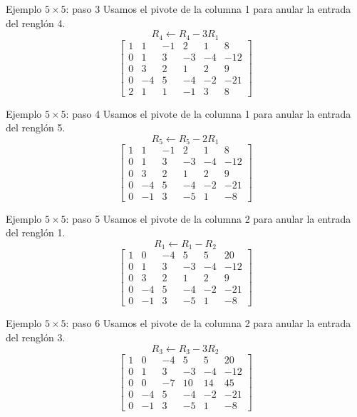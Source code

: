 \documentclass[aspectratio=169,9pt]{beamer}
\theoremstyle{remark}
\begin{document}
\begin{frame}[t]{Ejemplo $5\times5$: paso 3}
Usamos el pivote de la columna 1 para anular la entrada del renglón 4.
\[
R_{4}\leftarrow R_{4}-3R_{1}
\]
\[
\left[\begin{array}{ccccc|c}
1 & 1 & -1 & 2 & 1 & 8\\
0 & 1 & 3 & -3 & -4 & -12\\
0 & 3 & 2 & 1 & 2 & 9\\
0 & -4 & 5 & -4 & -2 & -21\\
2 & 1 & 1 & -1 & 3 & 8
\end{array}\right]
\]
\end{frame}
\begin{frame}[t]{Ejemplo $5\times5$: paso 4}
Usamos el pivote de la columna 1 para anular la entrada del renglón 5.
\[
R_{5}\leftarrow R_{5}-2R_{1}
\]
\[
\left[\begin{array}{ccccc|c}
1 & 1 & -1 & 2 & 1 & 8\\
0 & 1 & 3 & -3 & -4 & -12\\
0 & 3 & 2 & 1 & 2 & 9\\
0 & -4 & 5 & -4 & -2 & -21\\
0 & -1 & 3 & -5 & 1 & -8
\end{array}\right]
\]
\end{frame}
\begin{frame}[t]{Ejemplo $5\times5$: paso 5}
Usamos el pivote de la columna 2 para anular la entrada del renglón 1.
\[
R_{1}\leftarrow R_{1}-R_{2}
\]
\[
\left[\begin{array}{ccccc|c}
1 & 0 & -4 & 5 & 5 & 20\\
0 & 1 & 3 & -3 & -4 & -12\\
0 & 3 & 2 & 1 & 2 & 9\\
0 & -4 & 5 & -4 & -2 & -21\\
0 & -1 & 3 & -5 & 1 & -8
\end{array}\right]
\]
\end{frame}
\begin{frame}[t]{Ejemplo $5\times5$: paso 6}
Usamos el pivote de la columna 2 para anular la entrada del renglón 3.
\[
R_{3}\leftarrow R_{3}-3R_{2}
\]
\[
\left[\begin{array}{ccccc|c}
1 & 0 & -4 & 5 & 5 & 20\\
0 & 1 & 3 & -3 & -4 & -12\\
0 & 0 & -7 & 10 & 14 & 45\\
0 & -4 & 5 & -4 & -2 & -21\\
0 & -1 & 3 & -5 & 1 & -8
\end{array}\right]
\]
\end{frame}
\end{document}
